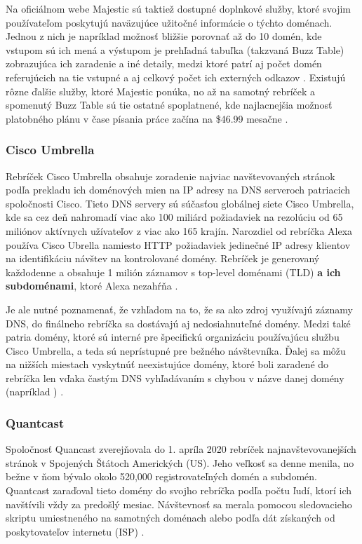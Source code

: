 Na oficiálnom webe Majestic sú taktiež dostupné doplnkové služby, ktoré svojim používateľom poskytujú naväzujúce užitočné informácie o týchto doménach. 
Jednou z nich je napríklad možnosť bližšie porovnať až do 10 domén, kde vstupom sú ich mená a výstupom je prehľadná tabuľka (takzvaná Buzz Table) zobrazujúca ich zaradenie a iné detaily, medzi ktoré patrí aj počet domén
referujúcich na tie vstupné a aj celkový počet ich externých odkazov \cite{majestic-million-homepage}.
Existujú rôzne ďalšie služby, ktoré Majestic ponúka, no až na samotný rebríček a spomenutý Buzz Table sú tie ostatné spoplatnené, kde najlacnejšia možnosť platobného plánu v čase písania práce začína na \$46.99 mesačne \cite{majestic-million-pricing}.

\subsubsection{Cisco Umbrella}

Rebríček Cisco Umbrella obsahuje zoradenie najviac navštevovaných stránok podľa prekladu ich doménových mien na IP adresy na DNS serveroch patriacich spoločnosti Cisco.
Tieto DNS servery sú súčasťou globálnej siete Cisco Umbrella, kde sa cez deň nahromadí viac ako 100 miliárd požiadaviek na rezolúciu od 65 miliónov aktívnych užívateľov z viac ako 165 krajín.
Narozdiel od rebríčka Alexa používa Cisco Ubrella namiesto HTTP požiadaviek jedinečné IP adresy klientov na identifikáciu návštev na kontrolované domény.
Rebríček je generovaný každodenne a obsahuje 1 milión záznamov s top-level doménami (TLD) \textbf{a ich subdoménami}, ktoré Alexa nezahŕňa \cite{cisco-umbrella}.

Je ale nutné poznamenať, že vzhľadom na to, že sa ako zdroj využívajú záznamy DNS, do finálneho rebríčka sa dostávajú aj nedosiahnuteľné domény.
Medzi také patria domény, ktoré sú interné pre špecifickú organizáciu používajúcu službu Cisco Umbrella, a teda sú neprístupné pre bežného návštevníka.
Ďalej sa môžu na nižších miestach vyskytnúť neexistujúce domény, ktoré boli zaradené do rebríčka len vďaka častým DNS vyhľadávaním s chybou v názve danej domény (napríklad ) \cite{tranco-methodology}.

\pagebreak

\subsubsection{Quantcast}

Spoločnosť Quancast zverejňovala do 1. apríla 2020 rebríček najnavštevovanejších stránok v Spojených Štátoch Amerických (US). Jeho veľkosť sa denne menila, no bežne v ňom bývalo
okolo 520,000 registrovateľných domén a subdomén. Quantcast zaraďoval tieto domény do svojho rebríčka podľa počtu ľudí, ktorí ich navštívili vždy za predošlý mesiac.
Návštevnosť sa merala pomocou sledovacieho skriptu umiestneného na samotných doménach alebo podľa dát získaných od poskytovateľov internetu (ISP) \cite{tranco-methodology}.


